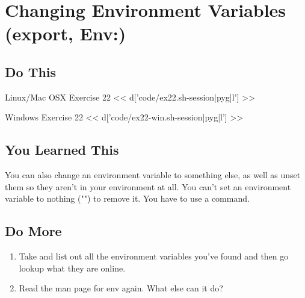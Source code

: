 \chapter{Changing Environment Variables (export, Env:)}

\section{Do This}

\begin{code}{Linux/Mac OSX Exercise 22}
<< d['code/ex22.sh-session|pyg|l'] >>
\end{code}

\begin{code}{Windows Exercise 22}
<< d['code/ex22-win.sh-session|pyg|l'] >>
\end{code}

\section{You Learned This}

You can also change an environment variable to something else, as well as
unset them so they aren't in your environment at all.  You can't set an
environment variable to nothing ("") to remove it.  You have to use a 
command.

\section{Do More}

\begin{enumerate}
\item Take and list out all the environment variables you've found and 
    then go lookup what they are online.
\item Read the man page for env again.  What else can it do?
\end{enumerate}

